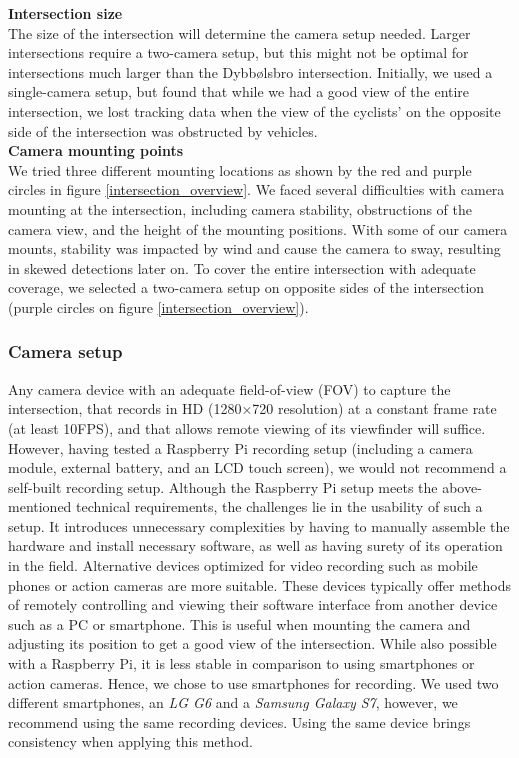 \textbf{Intersection size} \\
The size of the intersection will determine the camera setup needed. Larger intersections require a two-camera setup, 
but this might not be optimal for intersections much larger than the Dybbølsbro intersection. 
Initially, we used a single-camera setup, but found that while we had a good view of the entire intersection, 
we lost tracking data when the view of the cyclists' on the opposite side of the intersection was obstructed by vehicles.
\ \\

\textbf{Camera mounting points} \\
We tried three different mounting locations as shown by the red and purple circles in figure \ref{intersection_overview}. 
We faced several difficulties with camera mounting at the intersection, including camera stability, 
obstructions of the camera view, and the height of the mounting positions. 
With some of our camera mounts, stability was impacted by wind and cause the camera to sway, resulting in skewed detections later on.
To cover the entire intersection with adequate coverage, we selected a two-camera setup on opposite sides of the intersection 
(purple circles on figure \ref{intersection_overview}).

\subsubsection{Camera setup}
Any camera device with an adequate field-of-view (FOV) to capture the intersection, that records in HD (1280×720 resolution) at a constant 
frame rate (at least 10FPS), and that allows remote viewing of its viewfinder will suffice. 
However, having tested a Raspberry Pi recording setup (including a camera module, external battery, and an LCD touch screen), 
we would not recommend a self-built recording setup. Although the Raspberry Pi setup meets the above-mentioned technical requirements, 
the challenges lie in the usability of such a setup. 
It introduces unnecessary complexities by having to manually assemble the hardware and install necessary software, as well as 
having surety of its operation in the field.
Alternative devices optimized for video recording such as mobile phones or action cameras are more suitable.
These devices typically offer methods of remotely controlling and viewing their software interface from 
another device such as a PC or smartphone. 
This is useful when mounting the camera and adjusting its position to get a good view of the intersection. 
While also possible with a Raspberry Pi, it is less stable in comparison to using smartphones or action cameras.
Hence, we chose to use smartphones for recording. We used two different smartphones, an \textit{LG G6} and a \textit{Samsung Galaxy S7},
however, we recommend using the same recording devices. Using the same device brings consistency when applying this method.

